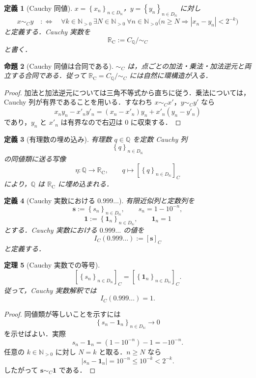 \documentclass[a4paper,11pt]{ltjsarticle}
\theoremstyle{jpdef}
\newtheorem{definition}{定義}[section]
\theoremstyle{jpthm}
\newtheorem{theorem}[definition]{定理}
\newtheorem{proposition}[definition]{命題}
\newcommand{\N}{\mathbb{N}}
\newcommand{\Q}{\mathbb{Q}}
\newcommand{\Ns}{\N_{>0}}
\newcommand{\DN}{D_{\N}}
\newcommand{\seq}[2]{\left\{#1\right\}_{#2}}
\newcommand{\RealC}{\mathbb{R}_{\mathrm C}}
\begin{document}
\begin{definition}[Cauchy 同値]
\(x=\seq{x_n}{n\in\DN}\)，\(y=\seq{y_n}{n\in\DN}\) に対し
\[
  x\sim_C y
  \quad:\Longleftrightarrow\quad
  \forall k\in\Ns\ \exists N\in\Ns\ \forall n\in\Ns
  \bigl(n\ge N\Rightarrow |x_n-y_n|<2^{-k}\bigr)
\]
と定義する．Cauchy 実数を
\[
  \RealC:=C_\Q/\sim_C
\]
と書く．
\end{definition}

\begin{proposition}[Cauchy 同値は合同である]
\(\sim_C\) は，点ごとの加法・乗法・加法逆元と両立する合同である．従って \(\RealC=C_\Q/\sim_C\) には自然に環構造が入る．
\end{proposition}

\begin{proof}
加法と加法逆元については三角不等式から直ちに従う．乗法については，Cauchy 列が有界であることを用いる．すなわち \(x\sim_C x'\)，\(y\sim_C y'\) なら
\[
  x_ny_n-x'_ny'_n=(x_n-x'_n)y_n+x'_n(y_n-y'_n)
\]
であり，\(y_n\) と \(x'_n\) は有界なので右辺は \(0\) に収束する．
\end{proof}

\begin{definition}[有理数の埋め込み]
有理数 \(q\in\Q\) を定数 Cauchy 列
\[
  \seq{q}{n\in\DN}
\]
の同値類に送る写像
\[
  \eta:\Q\to\RealC,
  \qquad
  q\longmapsto [\seq{q}{n\in\DN}]_C
\]
により，\(\Q\) は \(\RealC\) に埋め込まれる．
\end{definition}

\begin{definition}[Cauchy 実数における \(0.999\ldots\)]
有限近似列と定数列を
\[
  \mathbf s:=\seq{s_n}{n\in\DN},\qquad s_n=1-10^{-n},
\]
\[
  \mathbf 1:=\seq{\mathbf1_n}{n\in\DN},\qquad \mathbf1_n=1
\]
とする．Cauchy 実数における \(0.999\ldots\) の値を
\[
  I_C(0.999\ldots):=[\mathbf s]_C
\]
と定義する．
\end{definition}

\begin{theorem}[Cauchy 実数での等号]
\[
  [\seq{s_n}{n\in\DN}]_C=[\seq{\mathbf1_n}{n\in\DN}]_C.
\]
従って，Cauchy 実数解釈では
\[
  I_C(0.999\ldots)=1.
\]
\end{theorem}

\begin{proof}
同値類が等しいことを示すには
\[
  \seq{s_n-\mathbf1_n}{n\in\DN}\to0
\]
を示せばよい．実際
\[
  s_n-\mathbf1_n=(1-10^{-n})-1=-10^{-n}.
\]
任意の \(k\in\Ns\) に対し \(N=k\) と取る．\(n\ge N\) なら
\[
  |s_n-\mathbf1_n|=10^{-n}\le10^{-k}<2^{-k}.
\]
したがって \(\mathbf s\sim_C\mathbf1\) である．
\end{proof}
\end{document}
